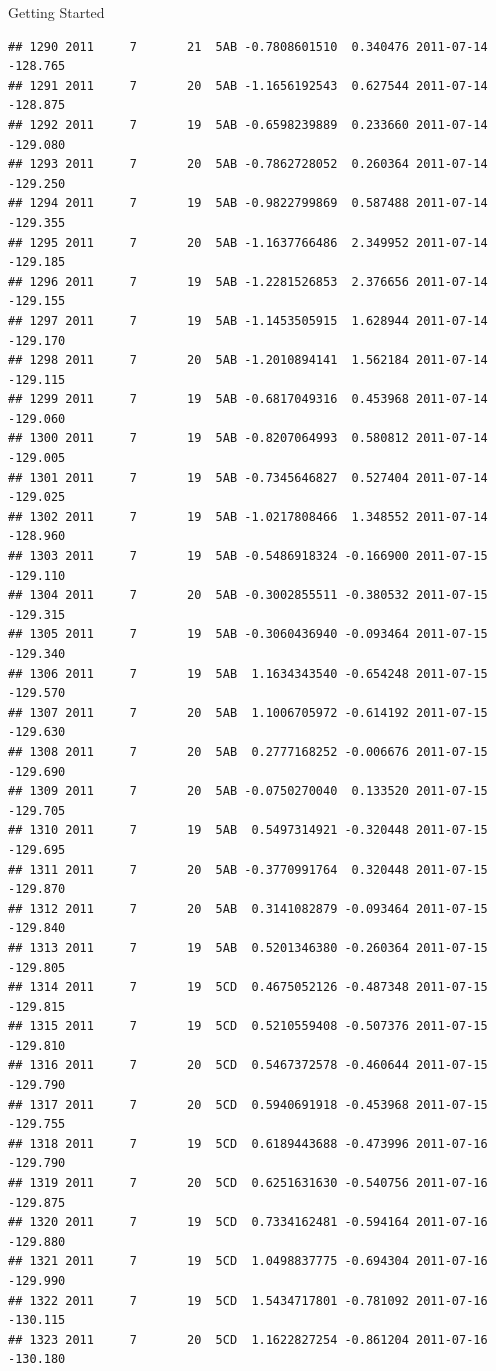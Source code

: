 \documentclass[
  ignorenonframetext,
]{beamer}
\begin{document}
\begin{frame}[fragile]{Getting Started}
\begin{verbatim}
## 1290 2011     7       21  5AB -0.7808601510  0.340476 2011-07-14 -128.765
## 1291 2011     7       20  5AB -1.1656192543  0.627544 2011-07-14 -128.875
## 1292 2011     7       19  5AB -0.6598239889  0.233660 2011-07-14 -129.080
## 1293 2011     7       20  5AB -0.7862728052  0.260364 2011-07-14 -129.250
## 1294 2011     7       19  5AB -0.9822799869  0.587488 2011-07-14 -129.355
## 1295 2011     7       20  5AB -1.1637766486  2.349952 2011-07-14 -129.185
## 1296 2011     7       19  5AB -1.2281526853  2.376656 2011-07-14 -129.155
## 1297 2011     7       19  5AB -1.1453505915  1.628944 2011-07-14 -129.170
## 1298 2011     7       20  5AB -1.2010894141  1.562184 2011-07-14 -129.115
## 1299 2011     7       19  5AB -0.6817049316  0.453968 2011-07-14 -129.060
## 1300 2011     7       19  5AB -0.8207064993  0.580812 2011-07-14 -129.005
## 1301 2011     7       19  5AB -0.7345646827  0.527404 2011-07-14 -129.025
## 1302 2011     7       19  5AB -1.0217808466  1.348552 2011-07-14 -128.960
## 1303 2011     7       19  5AB -0.5486918324 -0.166900 2011-07-15 -129.110
## 1304 2011     7       20  5AB -0.3002855511 -0.380532 2011-07-15 -129.315
## 1305 2011     7       19  5AB -0.3060436940 -0.093464 2011-07-15 -129.340
## 1306 2011     7       19  5AB  1.1634343540 -0.654248 2011-07-15 -129.570
## 1307 2011     7       20  5AB  1.1006705972 -0.614192 2011-07-15 -129.630
## 1308 2011     7       20  5AB  0.2777168252 -0.006676 2011-07-15 -129.690
## 1309 2011     7       20  5AB -0.0750270040  0.133520 2011-07-15 -129.705
## 1310 2011     7       19  5AB  0.5497314921 -0.320448 2011-07-15 -129.695
## 1311 2011     7       20  5AB -0.3770991764  0.320448 2011-07-15 -129.870
## 1312 2011     7       20  5AB  0.3141082879 -0.093464 2011-07-15 -129.840
## 1313 2011     7       19  5AB  0.5201346380 -0.260364 2011-07-15 -129.805
## 1314 2011     7       19  5CD  0.4675052126 -0.487348 2011-07-15 -129.815
## 1315 2011     7       19  5CD  0.5210559408 -0.507376 2011-07-15 -129.810
## 1316 2011     7       20  5CD  0.5467372578 -0.460644 2011-07-15 -129.790
## 1317 2011     7       20  5CD  0.5940691918 -0.453968 2011-07-15 -129.755
## 1318 2011     7       19  5CD  0.6189443688 -0.473996 2011-07-16 -129.790
## 1319 2011     7       20  5CD  0.6251631630 -0.540756 2011-07-16 -129.875
## 1320 2011     7       19  5CD  0.7334162481 -0.594164 2011-07-16 -129.880
## 1321 2011     7       19  5CD  1.0498837775 -0.694304 2011-07-16 -129.990
## 1322 2011     7       19  5CD  1.5434717801 -0.781092 2011-07-16 -130.115
## 1323 2011     7       20  5CD  1.1622827254 -0.861204 2011-07-16 -130.180

\end{verbatim}
\end{frame}
\end{document}

